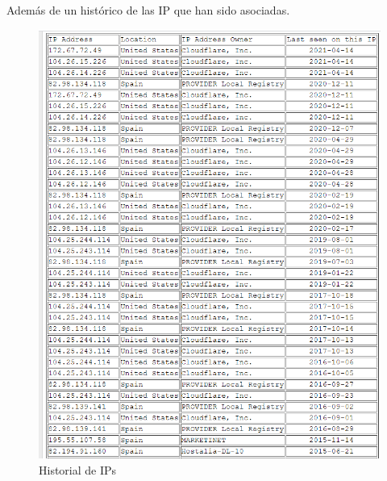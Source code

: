 \documentclass[12pt,twoside]{article}
\begin{document}
Además de un histórico de las IP que han sido asociadas.

\begin{figure}[h]
    \centering
    \includegraphics[scale=0.7]{./imagenes/historico_ip}
    \caption{Historial de IPs}
\end{figure}
\end{document}
